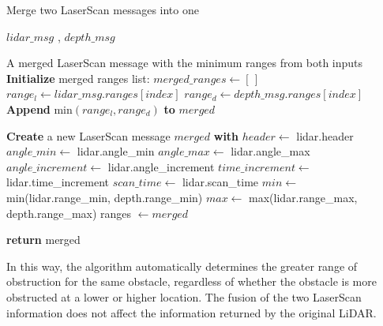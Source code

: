 \begin{algorithm}[H]
    \caption{Merge two LaserScan messages into one}\label{alg:scan_merge}
    \begin{algorithmic}
    \Require $lidar\_msg$ , $depth\_msg$ 
    
    \Ensure A merged LaserScan message with the minimum ranges from both inputs
    \State \textbf{Initialize} merged ranges list: $merged\_ranges \gets [\,]$
        \State $range_l \gets lidar\_msg.ranges[index]$
        \State $range_d \gets depth\_msg.ranges[index]$
        \State \textbf{Append} $\text{min}(range_l, range_d)$ \textbf{to} $merged$
    \EndFor

    \State \textbf{Create} a new LaserScan message $merged$ \textbf{with}
        \State $header \gets$ lidar.header
        \State $angle\_min \gets$ lidar.angle\_min
        \State $angle\_max \gets$ lidar.angle\_max
        \State $angle\_increment \gets$ lidar.angle\_increment
        \State $time\_increment \gets$ lidar.time\_increment
        \State $scan\_time \gets$ lidar.scan\_time
        \State $min \gets$ min(lidar.range\_min, depth.range\_min)
        \State $max \gets$ max(lidar.range\_max, depth.range\_max)
        \State ranges $\gets merged$

    \State \textbf{return} merged
    \end{algorithmic}
\end{algorithm}

In this way, the algorithm automatically determines the greater range of obstruction for the same obstacle, 
regardless of whether the obstacle is more obstructed at a lower or higher location. 
The fusion of the two LaserScan information does not affect the information returned by the original LiDAR.

